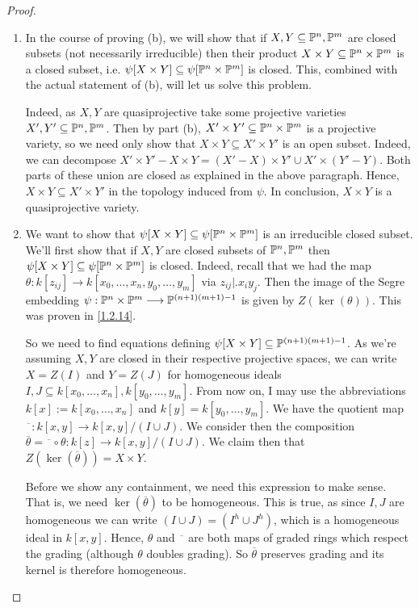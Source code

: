 \begin{proof}
    \begin{enumerate}[label = (\alph*)]
        \item In the course of proving (b), we will show that if $X, Y \subseteq \P^n, \P^m$ are closed subsets (not necessarily irreducible) then their product $X \times Y \subseteq \P^n \times \P^m$ is a closed subset, i.e. $\psi[X \times Y] \subseteq \psi[\P^n \times \P^m]$ is closed. This, combined with the actual statement of (b), will let us solve this problem.

        Indeed, as $X, Y$ are quasiprojective take some projective varieties $X', Y' \subseteq \P^n, \P^m$. Then by part (b), $X' \times Y' \subseteq \P^n \times \P^m$ is a projective variety, so we need only show that $X \times Y \subseteq X' \times Y'$ is an open subset. Indeed, we can decompose $X' \times Y' - X \times Y = (X' - X) \times Y' \cup X' \times (Y' - Y)$. Both parts of these union are closed as explained in the above paragraph. Hence, $X \times Y \subseteq X' \times Y'$ in the topology induced from $\psi$. In conclusion, $X \times Y$ is a quasiprojective variety.

        \item We want to show that $\psi[X \times Y] \subseteq \psi[\P^n \times \P^m]$ is an irreducible closed subset. We'll first show that if $X, Y$ are closed subsets of $\P^n, \P^m$ then $\psi[X \times Y] \subseteq \psi[\P^n \times \P^m]$ is closed. Indeed, recall that we had the map $\theta: k[z_{ij}] \longrightarrow k[x_0, \dots, x_n, y_0, \dots, y_m]$ via $z_{ij} |.x_i y_j$. Then the image of the Segre embedding $\psi: \P^n \times \P^m \longrightarrow \P^{(n+1)(m+1)-1}$ is given by $Z(\ker(\theta))$. This was proven in \ref{1.2.14}.

        So we need to find equations defining $\psi[X \times Y] \subseteq \P^{(n+1)(m+1)-1}$. As we're assuming $X, Y$ are closed in their respective projective spaces, we can write $X = Z(I)$ and $Y = Z(J)$ for homogeneous ideals $I, J \subseteq k[x_0, \dots, x_n], k[y_0, \dots, y_m]$. From now on, I may use the abbreviations $k[x] := k[x_0, \dots, x_n]$ and $k[y] = k[y_0, \dots, y_m]$. We have the quotient map $\overline{\phantom{a}}: k[x, y] \longrightarrow k[x, y]/(I \cup J)$. We consider then the composition $\overline \theta = \overline{\phantom a} \circ \theta: k[z] \longrightarrow k[x, y]/(I \cup J)$. We claim then that $Z(\ker(\overline \theta)) = X \times Y$.

        Before we show any containment, we need this expression to make sense. That is, we need $\ker(\overline \theta)$ to be homogeneous. This is true, as since $I, J$ are homogeneous we can write $(I \cup J) = (I^h \cup J^h)$, which is a homogeneous ideal in $k[x, y]$. Hence, $\theta$ and $\overline{\phantom{a}}$ are both maps of graded rings which respect the grading (although $\theta$ doubles grading). So $\overline \theta$ preserves grading and its kernel is therefore homogeneous.


\end{enumerate}
\end{proof}

